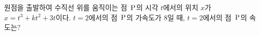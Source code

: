 원점을 출발하여 수직선 위를 움직이는 점~$\mathrm{P}$의 시각 $t$에서의 위치 $x$가 $x=t^3+kt^2+3t$이다. $t=2$에서의 점~$\mathrm{P}$의 가속도가 $8$일 때, $t=2$에서의 점~$\mathrm{P}$의 속도는? 
